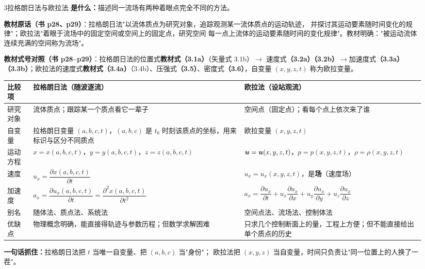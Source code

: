 \begin{kaodian}{3}{拉格朗日法与欧拉法}
\textbf{是什么：}描述同一流场有两种着眼点完全不同的方法。

\textbf{教材原话（书 p28、p29）}：拉格朗日法"以流体质点为研究对象，追踪观测某一流体质点的运动轨迹，
并探讨其运动要素随时间变化的规律"；欧拉法"着眼于流场中的固定空间或空间上的固定点，研究空间
每一点上流体的运动要素随时间的变化规律"。教材明确："被运动流体连续充满的空间称为流场"。

\textbf{教材式号对照（书 p28--p29）}：拉格朗日法的位置式\textbf{教材式（3.1a）}（矢量式 3.1b）$\rightarrow$
速度式\textbf{（3.2a）（3.2b）}$\rightarrow$加速度式\textbf{（3.3a）（3.3b）}；欧拉法的速度式\textbf{教材式（3.4a）}（3.4b）、压强式\textbf{（3.5）}、密度式\textbf{（3.6）}，自变量 $(x,y,z,t)$ 称为欧拉变量。

\begin{center}
\begin{tabularx}{\textwidth}{@{}lXX@{}}
\toprule
比较项 & 拉格朗日法（随波逐流） & 欧拉法（设站观流） \\
\midrule
研究对象 & 流体质点；跟踪某一个质点看它一辈子 & 空间点（固定点）；看每个点上依次来了谁 \\
自变量 & 拉格朗日变量 $(a,b,c,t)$，$(a,b,c)$ 是 $t_0$ 时刻该质点的坐标，用来标识与区分不同质点 & 欧拉变量 $(x,y,z,t)$ \\
运动方程 & $x=x(a,b,c,t)$，$y=y(a,b,c,t)$，$z=z(a,b,c,t)$ & $\bm{u}=\bm{u}(x,y,z,t)$，$p=p(x,y,z,t)$，$\rho=\rho(x,y,z,t)$ \\
速度 & $u_x=\dfrac{\partial x(a,b,c,t)}{\partial t}$ & $u_x=u_x(x,y,z,t)$，是\textbf{场}（速度场） \\
加速度 & $a_x=\dfrac{\partial u_x(a,b,c,t)}{\partial t}=\dfrac{\partial^2 x(a,b,c,t)}{\partial t^2}$ & $a_x=\dfrac{\partial u_x}{\partial t}+u_x\dfrac{\partial u_x}{\partial x}+u_y\dfrac{\partial u_x}{\partial y}+u_z\dfrac{\partial u_x}{\partial z}$ \\
别名 & 随体法、质点法、系统法 & 空间点法、流场法、控制体法 \\
优缺点 & 物理概念明确，能直接得轨迹与参数历程；但数学求解困难 & 只求几个控制断面上的量，工程上方便；但不能直接给出单个质点的历史 \\
\bottomrule
\end{tabularx}
\end{center}

\textbf{一句话抓住：}拉格朗日法把 $t$ 当唯一自变量、把 $(a,b,c)$ 当"身份"；
欧拉法把 $(x,y,z)$ 当自变量，时间只负责让"同一位置上的人换了一茬"。


\end{kaodian}
